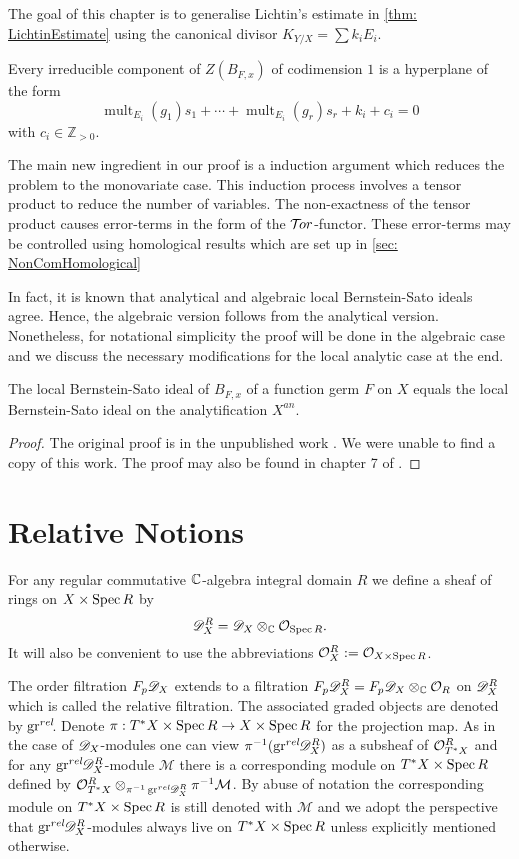 The goal of this chapter is to generalise Lichtin's estimate in \cref{thm: LichtinEstimate} using the canonical divisor $K_{Y/X} = \sum k_i E_i$.
\begin{theorem}\label{thm: EstimateBernsteinSatoZeroLocust}
  Every irreducible component of $Z(B_{F,x})$ of codimension $1$ is a hyperplane of the form
  $$\operatorname{mult}_{E_i}(g_1) s_1 + \cdots + \operatorname{mult}_{E_i}(g_r)s_r + k_i + c_i=0$$
  with $c_i \in \mathbb{Z}_{> 0 }$.
\end{theorem}
The main new ingredient in our proof is a induction argument which reduces the problem to the monovariate case.
This induction process involves a tensor product to reduce the number of variables.
The non-exactness of the tensor product causes error-terms in the form of the $\mathcal{T}\mkern -3mu or$-functor.
These error-terms may be controlled using homological results which are set up in \cref{sec: NonComHomological}

In fact, it is known that analytical and algebraic local Bernstein-Sato ideals agree.
Hence, the algebraic version follows from the analytical version.
Nonetheless, for notational simplicity the proof will be done in the algebraic case and we discuss the necessary modifications for the local analytic case at the end.
\begin{theorem}\label{thm: AnalyticAlgebraic}
  The local Bernstein-Sato ideal of $B_{F,x}$ of a function germ $F$ on $X$ equals the local Bernstein-Sato ideal on the analytification $X^{an}$.
\end{theorem}
\begin{proof}
  The original proof is in the unpublished work \cite{brianccon2002remarques}.
  We were unable to find a copy of this work.
  The proof may also be found in chapter 7 of \cite{MasterThesisBSLocal}.
\end{proof}
\section{Relative Notions}
For any regular commutative $\mathbb{C}$-algebra integral domain $R$ we define a sheaf of rings on $X\times \operatorname{Spec} R$ by
$$\mathscr{D}_{X}^R = \mathscr{D}_X \otimes_{\mathbb{C}} \mathcal{O}_{\operatorname{Spec} R}.$$
It will also be convenient to use the abbreviations $\mathcal{O}_{X}^R := \mathcal{O}_{X \times \operatorname{Spec} R}$.

The order filtration $F_p\mathscr{D}_X$ extends to a filtration $F_p\mathscr{D}^R_X = F_p\mathscr{D}_X \otimes_{\mathbb{C}} \mathcal{O}_R$ on $\mathscr{D}^R_X$ which is called the relative filtration.
The associated graded objects are denoted by $\operatorname{gr}^{rel}\mkern-5mu$. Denote $\pi:T^*X\times \operatorname{Spec} R \to X\times \operatorname{Spec} R$ for the projection map.
As in the case of $\mathscr{D}_X$-modules one can view $\pi^{-1}(\operatorname{gr}^{rel}\mkern-5mu\mathscr{D}_X^R)$ as a subsheaf of $\mathcal{O}_{T^*X}^R$ and for any $\operatorname{gr}^{rel}\mkern-5mu\mathscr{D}_X^R$-module $\mathcal{M}$ there is a corresponding module on $T^*X\times \operatorname{Spec} R$ defined by $\mathcal{O}_{T^*X}^R\otimes_{\pi^{-1}\operatorname{gr}^{rel}\mkern-5mu\mathscr{D}_X^R}\pi^{-1}\mathcal{M}$.
By abuse of notation the corresponding module on $T^*X\times \operatorname{Spec} R$ is still denoted with $\mathcal{M}$ and we adopt the perspective that $\operatorname{gr}^{rel}\mkern-5mu\mathscr{D}_X^R$-modules always live on $T^*X\times \operatorname{Spec} R$ unless explicitly mentioned otherwise.

